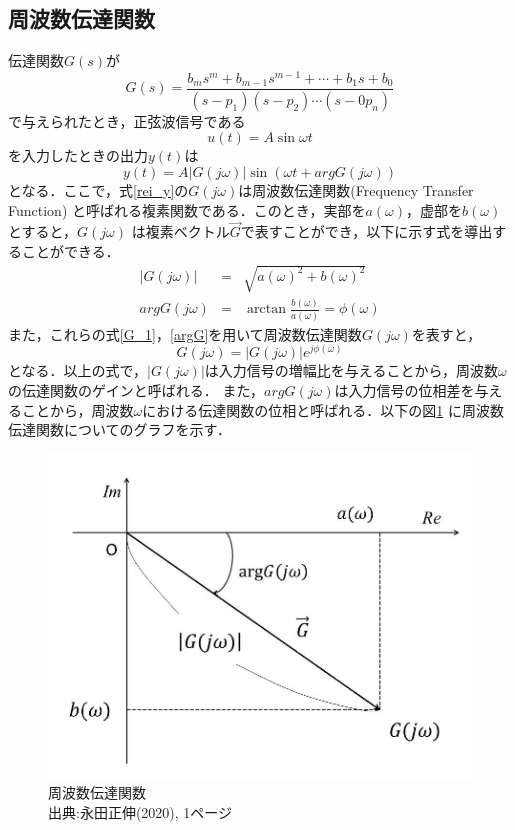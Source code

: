 \documentclass[a4paper,11pt]{jsarticle}
\begin{document}
  \subsection{周波数伝達関数}
    伝達関数$G(s)$が\\
    \begin{equation}
      G(s) = \frac{b_ms^m+b_{m-1}s^{m-1}+\cdots + b_1s+b_0}{(s-p_1)(s-p_2)\cdots (s-0p_n)}
    \end{equation}
    で与えられたとき，正弦波信号である\\
    \begin{equation}
      u(t) = A\sin{\omega t}
    \end{equation}
    を入力したときの出力$y(t)$は\\
    \begin{equation}
      y(t) = A|G(j\omega)| \sin{(\omega t + argG(j\omega))}
      \label{rei_y}
    \end{equation}
    となる．ここで，式\ref{rei_y}の$G(j\omega)$は周波数伝達関数(Frequency Transfer Function)
    と呼ばれる複素関数である．このとき，実部を$a(\omega)$，虚部を$b(\omega)$とすると，$G(j\omega)$
    は複素ベクトル$\overrightarrow{G}$で表すことができ，以下に示す式を導出することができる．
    \begin{eqnarray}
      |G(j\omega)| &=& \sqrt{a(\omega)^2 + b(\omega)^2}\\ \label{G_1}
      argG(j\omega) &=&  \arctan{\frac{b(\omega)}{a(\omega)}} = \phi (\omega) \label{argG}
    \end{eqnarray}
    また，これらの式\ref{G_1}，\ref{argG}を用いて周波数伝達関数$G(j\omega)$を表すと，
    \begin{equation}
      G(j\omega)= |G(j\omega)|e^{j\phi (\omega)}
    \end{equation}
    となる．以上の式で，$|G(j\omega)|$は入力信号の増幅比を与えることから，周波数$\omega$の伝達関数のゲインと呼ばれる．
    また，$argG(j\omega)$は入力信号の位相差を与えることから，周波数$\omega$における伝達関数の位相と呼ばれる．以下の図\ref{P:G_1}
    に周波数伝達関数についてのグラフを示す．~\cite{text}
    \begin{figure}[H]
      \centering
      \includegraphics[width=0.5\linewidth]{picture/G_1.png}
      \caption{周波数伝達関数\\出典:永田正伸(2020), 1ページ\cite{text}}
      \label{P:G_1}
    \end{figure}
\end{document}
